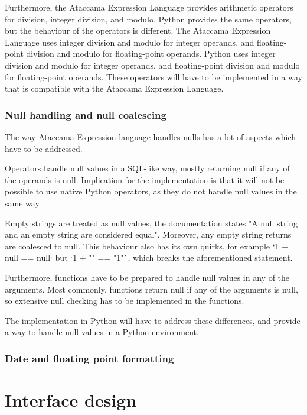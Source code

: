 Furthermore, the Ataccama Expression Language provides arithmetic operators for division, integer division, and modulo. Python provides the same operators, but the behaviour of the operators is different. The Ataccama Expression Language uses integer division and modulo for integer operands, and floating-point division and modulo for floating-point operands. Python uses integer division and modulo for integer operands, and floating-point division and modulo for floating-point operands. These operators will have to be implemented in a way that is compatible with the Ataccama Expression Language.

\subsubsection{Null handling and null coalescing}

The way Ataccama Expression language handles nulls has a lot of aspects which have to be addressed. 

Operators handle null values in a SQL-like way, mostly returning null if any of the operands is null. Implication for the implementation is that it will not be possible to use native Python operators, as they do not handle null values in the same way. 

Empty strings are treated as null values, the documentation states "A null string and an empty string are considered equal". Moreover, any empty string returns are coalesced to null. This behaviour also has its own quirks, for example `1 + null == null` but `1 + "" == "1"`, which breaks the aforementioned statement.

Furthermore, functions have to be prepared to handle null values in any of the arguments. Most commonly, functions return null if any of the arguments is null, so extensive null checking has to be implemented in the functions.

The implementation in Python will have to address these differences, and provide a way to handle null values in a Python environment.

\subsubsection{Date and floating point formatting}


\section{Interface design}

